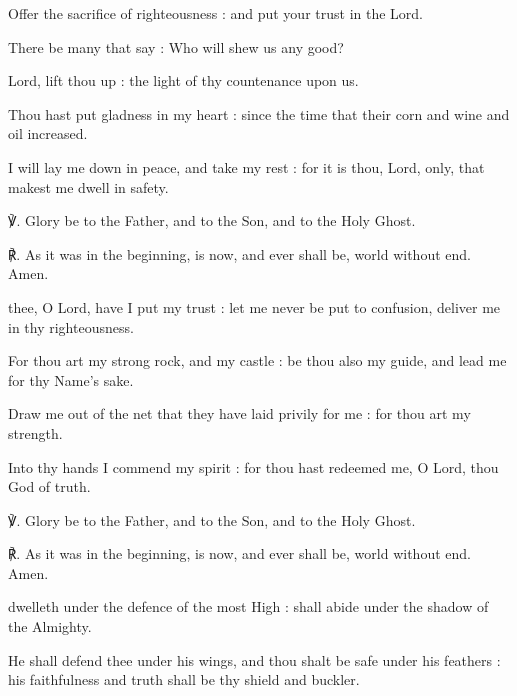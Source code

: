 Offer the sacrifice of righteousness : and put your trust in the Lord.\par
{}There be many that say : Who will shew us any good?\par
{}Lord, lift thou up : the light of thy countenance upon us.\par
{}Thou hast put gladness in my heart : since the time that their corn and wine and oil increased.\par
{}I will lay me down in peace, and take my rest : for it is thou, Lord, only, that makest me dwell in safety.\par
℣. Glory be to the Father, and to the Son, and to the Holy Ghost.\par
℟. As it was in the beginning, is now, and ever shall be, world without end. Amen.
\par
{}
 thee, O Lord, have I put my trust : let me never be put to confusion, deliver me in thy righteousness.\par
{}
For thou art my strong rock, and my castle : be thou also my guide, and lead me for thy Name's sake.\par
{}Draw me out of the net that they have laid privily for me : for thou art my strength.\par
{}Into thy hands I commend my spirit : for thou hast redeemed me, O Lord, thou God of truth.\par
℣. Glory be to the Father, and to the Son, and to the Holy Ghost.\par
℟. As it was in the beginning, is now, and ever shall be, world without end. Amen.
\par
{}
 dwelleth under the defence of the most High : shall abide under the shadow of the Almighty.\par
{}
He shall defend thee under his wings, and thou shalt be safe under his feathers : his faithfulness and truth shall be thy shield and buckler.\par
